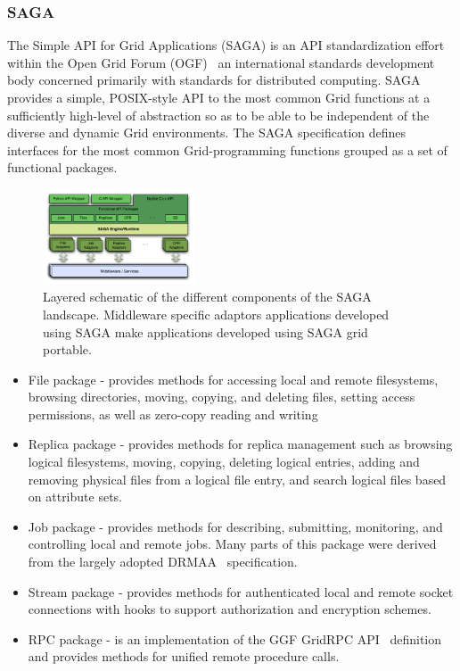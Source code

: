 \documentclass[conference,final]{IEEEtran}
\begin{document}
\subsubsection{SAGA}

The Simple API for Grid Applications (SAGA) is an API standardization
effort within the Open Grid Forum (OGF)~\cite{ogf_web} an
international standards development body concerned primarily with
standards for distributed computing.  SAGA provides a simple,
POSIX-style API to the most common Grid functions at a sufficiently
high-level of abstraction so as to be able to be independent of the
diverse and dynamic Grid environments. The SAGA specification defines
interfaces for the most common Grid-programming functions grouped as a
set of functional packages.

\begin{figure}[!ht]
  \begin{center}
      \includegraphics[width=0.40\textwidth]{stci_saga_figures-1.pdf}
  \end{center}
  \caption{\small Layered schematic of the different components
    of the SAGA landscape.  Middleware specific adaptors applications
    developed using SAGA make applications developed using SAGA grid
    portable.}
 \label{sagalayer}
\end{figure}

\begin{itemize}
\item File package - provides methods for accessing local and remote
  filesystems, browsing directories, moving, copying, and deleting
  files, setting access permissions, as well as zero-copy reading and
  writing
\item Replica package - provides methods for replica management such
  as browsing logical filesystems, moving, copying, deleting logical
  entries, adding and removing physical files from a logical file
  entry, and search logical files based on attribute sets.
\item Job package - provides methods for describing, submitting,
  monitoring, and controlling local and remote jobs. Many parts of
  this package were derived from the largely adopted
  DRMAA~\cite{drmaa_url} specification.
\item Stream package - provides methods for authenticated local and
  remote socket connections with hooks to support authorization and
  encryption schemes.
\item RPC package - is an implementation of the GGF GridRPC
  API~\cite{gridrpc_url} definition and provides methods for unified
  remote procedure calls.
\end{itemize}
\end{document}
